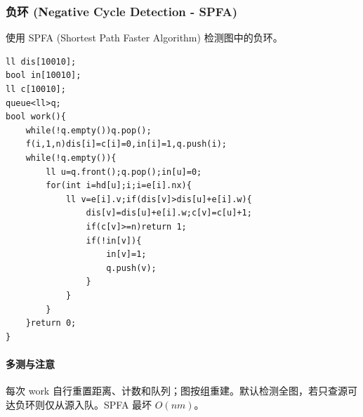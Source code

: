 \subsubsection{负环 (Negative Cycle Detection - SPFA)}
使用 SPFA (Shortest Path Faster Algorithm) 检测图中的负环。
\begin{lstlisting}
ll dis[10010];
bool in[10010];
ll c[10010];
queue<ll>q;
bool work(){
	while(!q.empty())q.pop();
    f(i,1,n)dis[i]=c[i]=0,in[i]=1,q.push(i);
	while(!q.empty()){
		ll u=q.front();q.pop();in[u]=0;
		for(int i=hd[u];i;i=e[i].nx){
			ll v=e[i].v;if(dis[v]>dis[u]+e[i].w){
				dis[v]=dis[u]+e[i].w;c[v]=c[u]+1;
                if(c[v]>=n)return 1;
				if(!in[v]){
					in[v]=1;
					q.push(v);
				}
			}
		}
	}return 0;
}
\end{lstlisting}

\paragraph{多测与注意} 每次 work 自行重置距离、计数和队列；图按组重建。默认检测全图，若只查源可达负环则仅从源入队。SPFA 最坏 $O(nm)$。
